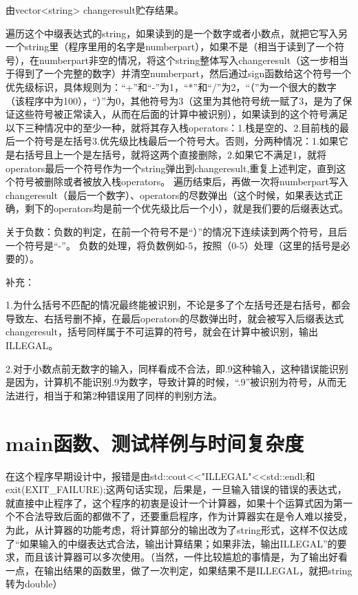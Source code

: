 \documentclass[UTF8]{ctexart}
\begin{document}
由vector<string> changeresult贮存结果。

遍历这个中缀表达式的string，如果读到的是一个数字或者小数点，就把它写入另一个string里（程序里用的名字是numberpart），如果不是（相当于读到了一个符号），在numberpart非空的情况，将这个string整体写入changeresult（这一步相当于得到了一个完整的数字）并清空numberpart，然后通过sign函数给这个符号一个优先级标识，具体规则为：“+”和“-”为1，“*”和“/”为2，“（”为一个很大的数字（该程序中为100），“）”为0，其他符号为3（这里为其他符号统一赋了3，是为了保证这些符号被正常读入，从而在后面的计算中被识别），如果读到的这个符号满足以下三种情况中的至少一种，就将其存入栈operators：1.栈是空的、2.目前栈的最后一个符号是左括号3.优先级比栈最后一个符号大。否则，分两种情况：1.如果它是右括号且上一个是左括号，就将这两个直接删除，2.如果它不满足1，就将operators最后一个符号作为一个string弹出到changeresult,重复上述判定，直到这个符号被删除或者被放入栈operators。
遍历结束后，再做一次将numberpart写入changeresult（最后一个数字）、operators的尽数弹出（这个时候，如果表达式正确，剩下的operators均是前一个优先级比后一个小），就是我们要的后缀表达式。

关于负数：负数的判定，在前一个符号不是“）”的情况下连续读到两个符号，且后一个符号是“-”。
负数的处理，将负数例如-5，按照（0-5）处理（这里的括号是必要的）。

补充：

1.为什么括号不匹配的情况最终能被识别，不论是多了个左括号还是右括号，都会导致左、右括号删不掉，在最后operators的尽数弹出时，就会被写入后缀表达式changeresult，括号同样属于不可运算的符号，就会在计算中被识别，输出ILLEGAL。

2.对于小数点前无数字的输入，同样看成不合法，即.9这种输入，这种错误能识别是因为，计算机不能识别.9为数字，导致计算的时候，“.9”被识别为符号，从而无法进行，相当于和第2种错误用了同样的判别方法。

\section{main函数、测试样例与时间复杂度}
在这个程序早期设计中，报错是由std::cout<<"ILLEGAL"<<std::endl;和exit(EXIT\_FAILURE);这两句话实现，后果是，一旦输入错误的错误的表达式，就直接中止程序了，这个程序的初衷是设计一个计算器，如果十个运算式因为第一个不合法导致后面的都做不了，还要重启程序，作为计算器实在是令人难以接受，为此，从计算器的功能考虑，将计算部分的输出改为了string形式，这样不仅达成了“如果输入的中缀表达式合法，输出计算结果；如果非法，输出ILLEGAL”的要求，而且该计算器可以多次使用。（当然，一件比较尴尬的事情是，为了输出好看一点，在输出结果的函数里，做了一次判定，如果结果不是ILLEGAL，就把string转为double）
 
\end{document}
